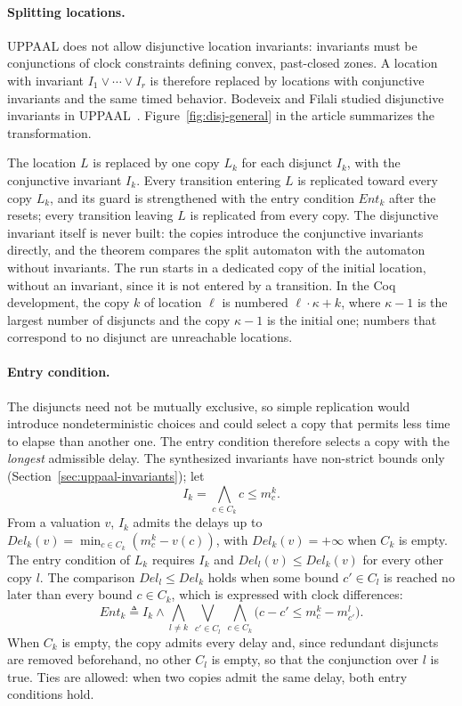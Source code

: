 \paragraph{Splitting locations.}
UPPAAL does not allow disjunctive location invariants: invariants must be
conjunctions of clock constraints defining convex, past-closed zones.  A
location with invariant $I_1\lor\cdots\lor I_r$ is therefore replaced by
locations with conjunctive invariants and the same timed behavior.  Bodeveix
and Filali studied disjunctive invariants in UPPAAL~\cite{[BF03]}.
Figure~\ref{fig:disj-general} in the article summarizes the transformation.

The location $L$ is replaced by one copy $L_k$ for each disjunct $I_k$, with
the conjunctive invariant $I_k$.  Every transition entering $L$ is replicated
toward every copy $L_k$, and its guard is strengthened with the entry condition
$\mathit{Ent}_k$ after the resets; every transition leaving $L$ is replicated from every
copy.  The disjunctive invariant itself is never built: the copies introduce
the conjunctive invariants directly, and the theorem compares the split
automaton with the automaton without invariants.  The run starts in a dedicated
copy of the initial location, without an invariant, since it is not entered by a
transition.  In the Coq development, the copy $k$ of location $\ell$ is numbered
$\ell\cdot\kappa+k$, where $\kappa-1$ is the largest number of disjuncts and the copy
$\kappa-1$ is the initial one; numbers that correspond to no disjunct are unreachable
locations.

\paragraph{Entry condition.}
The disjuncts need not be mutually exclusive, so simple replication would
introduce nondeterministic choices and could select a copy that permits less
time to elapse than another one.  The entry condition therefore selects a copy
with the \emph{longest} admissible delay.  The synthesized invariants have
non-strict bounds only (Section~\ref{sec:uppaal-invariants}); let
\[
  I_k = \bigwedge_{c\in C_k} c\le m^k_c.
\]
From a valuation $v$, $I_k$ admits the delays up to
$\mathit{Del}_k(v)=\min_{c\in C_k}(m^k_c-v(c))$, with $\mathit{Del}_k(v)=+\infty$ when $C_k$ is
empty.  The entry condition of $L_k$ requires $I_k$ and $\mathit{Del}_l(v)\le \mathit{Del}_k(v)$ for
every other copy $l$.  The comparison $\mathit{Del}_l\le \mathit{Del}_k$ holds when some bound
$c'\in C_l$ is reached no later than every bound $c\in C_k$, which is expressed
with clock differences:
\[
\mathit{Ent}_k\triangleq I_k \land
\bigwedge_{l\neq k}\ \bigvee_{c'\in C_l}\ \bigwedge_{c\in C_k}
 \bigl(c-c'\le m^k_c-m^l_{c'}\bigr).
\]
When $C_k$ is empty, the copy admits every delay and, since redundant
disjuncts are removed beforehand, no other $C_l$ is empty, so that the
conjunction over $l$ is true.  Ties are allowed: when two copies admit the same delay, both entry
conditions hold.

